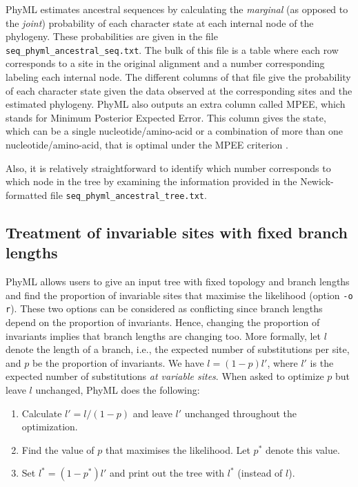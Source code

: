 \documentclass[a4paper,12pt]{article}
\newcommand{\x}[1]{\texttt{#1}}
\begin{document}
PhyML estimates ancestral sequences by calculating the {\em marginal} (as opposed to the {\em joint}) probability of each character
  state at each internal node of the phylogeny. These probabilities are given in the file
\x{seq\_phyml\_ancestral\_seq.txt}. The bulk of this file is a table where each row corresponds to a
site in the original alignment and a number corresponding labeling each internal node. The different
columns of that file give the probability of each character state given the data observed at the
corresponding sites and the estimated phylogeny. PhyML also outputs
an extra column called MPEE, which stands for Minimum Posterior Expected Error. This column gives the
state, which can be a single nucleotide/amino-acid or a combination of more than one nucleotide/amino-acid, that is
optimal under the MPEE criterion \cite{oliva19}.

Also, it is relatively straightforward to identify which number corresponds to which node in the tree by examining the
information provided in the Newick-formatted file \x{seq\_phyml\_ancestral\_tree.txt}.


\subsection{Treatment of invariable sites with fixed branch lengths}

PhyML  allows users  to give  an input  tree with  fixed topology  and branch  lengths and  find the
proportion of invariable sites that maximise the likelihood (option \x{-o r}). These two options can
be considered  as conflicting since  branch lengths depend  on the proportion of  invariants. Hence,
changing the proportion  of invariants implies that branch lengths are  changing too. More formally,
let $l$ denote the length of a branch,  i.e., the expected number of substitutions per site, and $p$
be  the proportion  of invariants.  We have  $l =  (1-p)l'$, where  $l'$ is  the expected  number of
substitutions {\em at  variable sites}.  When  asked to optimize  $p$ but leave $l$  unchanged, PhyML
does the following:
\begin{enumerate}
\item Calculate $l' = l/(1-p)$ and leave $l'$ unchanged throughout the optimization.
\item Find the value of $p$ that maximises the likelihood. Let $p^{*}$ denote this value.
\item Set $l^{*} = (1-p^{*})l'$ and print out the tree with $l^{*}$ (instead of $l$).
\end{enumerate}
\end{document}
